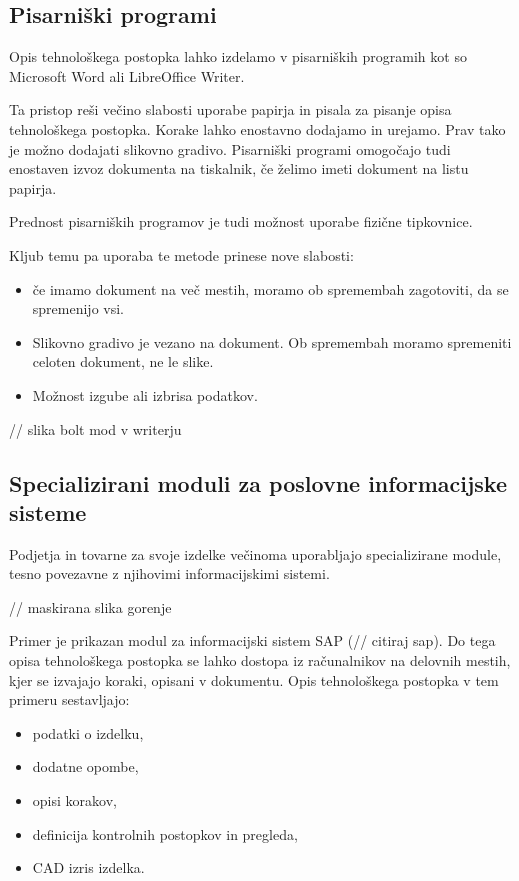 \documentclass[a4paper, 12pt]{book}
\begin{document}
\subsection{Pisarniški programi}

Opis tehnološkega postopka lahko izdelamo v pisarniških programih kot so Microsoft Word ali LibreOffice Writer.

Ta pristop reši večino slabosti uporabe papirja in pisala za pisanje opisa tehnološkega postopka.
Korake lahko enostavno dodajamo in urejamo.
Prav tako je možno dodajati slikovno gradivo.
Pisarniški programi omogočajo tudi enostaven izvoz dokumenta na tiskalnik, če želimo imeti dokument na listu papirja.

Prednost pisarniških programov je tudi možnost uporabe fizične tipkovnice.

Kljub temu pa uporaba te metode prinese nove slabosti:
\begin{itemize}
	\item če imamo dokument na več mestih, moramo ob spremembah zagotoviti, da se spremenijo vsi.
	\item Slikovno gradivo je vezano na dokument. Ob spremembah moramo spremeniti celoten dokument, ne le slike.
	\item Možnost izgube ali izbrisa podatkov.
\end{itemize}

// slika bolt mod v writerju

\subsection{Specializirani moduli za poslovne informacijske sisteme}

Podjetja in tovarne za svoje izdelke večinoma uporabljajo specializirane module, tesno povezavne z njihovimi informacijskimi sistemi.

// maskirana slika gorenje

Primer je prikazan modul za informacijski sistem SAP (// citiraj sap).
Do tega opisa tehnološkega postopka se lahko dostopa iz računalnikov na delovnih mestih, kjer se izvajajo koraki, opisani v dokumentu.
Opis tehnološkega postopka v tem primeru sestavljajo:
\begin{itemize}
	\item podatki o izdelku,
	\item dodatne opombe,
	\item opisi korakov,
	\item definicija kontrolnih postopkov in pregleda, 
	\item CAD izris izdelka.
\end{itemize}
\end{document}
